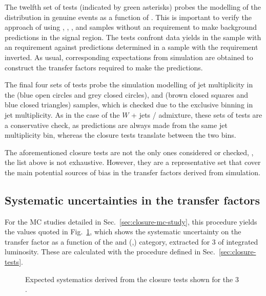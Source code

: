 The twelfth set of tests (indicated by green asterisks) probes the
modelling of the \alphat distribution in genuine \met events as a
function of \scalht. This is important to verify the approach of using
\mj, \ej, \mmj, and \eej samples without an \alphat requirement to
make background predictions in the signal region. The tests confront
data yields in the \mj sample with an \alphat requirement against
predictions determined in a \mj sample with the \alphat requirement
inverted. As usual, corresponding expectations from simulation are
obtained to construct the transfer factors required to make the
predictions.

The final four sets of tests probe the simulation modelling of jet
multiplicity in the \ej (blue open circles and grey closed circles),
and \eej (brown closed squares and blue closed triangles) samples,
which is checked due to the exclusive binning in jet multiplicity.  As
in the case of the $W$ + jets / \ttbar admixture, these sets of tests
are a conservative check, as predictions are always made from the same
jet multiplicity bin, whereas the closure tests translate between the
two bins.

The aforementioned closure tests are not the only ones considered or
checked, \ie, the list above is not exhaustive. However, they are a
representative set that cover the main potential sources of bias in
the transfer factors derived from simulation. 

\subsection{Systematic uncertainties in the transfer
factors\label{sec:syst-from-closurei-3fb}}

For the MC studies detailed in Sec.~\ref{sec:closure-mc-study}, this 
procedure yields the values quoted in
Fig.~\ref{fig:systematics}, which shows the systematic uncertainty
on the transfer factor as a function of the \scalht and (\nb,\njet)
category, extracted for 3 \ifb of integrated luminosity. These are
calculated with the procedure defined in
Sec.~\ref{sec:closure-tests}.

\begin{figure}[]
  \centering
  \caption{\label{fig:systematics} Expected systematics derived from the closure tests shown for
the 3 \ifb.}
\end{figure}

